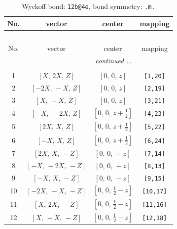 \documentclass[fleqn,8pt]{jsarticle}
\begin{document}
\renewcommand{\arraystretch}{1.2}
\begin{longtable}{cccc}
\caption{Wyckoff bond: {\tt 12b@4e}, bond symmetry: {\tt .m.}}
 \\
 \hline \hline
No. & vector & center & mapping \\ \hline \endfirsthead

\multicolumn{3}{l}{\tablename\ \thetable{}} \\
 \hline \hline
No. & vector & center & mapping \\ \hline \endhead

 \hline \hline
\multicolumn{3}{r}{\footnotesize\it continued ...} \\ \endfoot

 \hline \hline
\multicolumn{3}{r}{} \\ \endlastfoot

1 & $\left[ X,\, 2 X,\, Z \right]$ & $\left[ 0,\, 0,\, z \right]$ & {\tt [1,20]} \\ \hline
2 & $\left[ - 2 X,\, - X,\, Z \right]$ & $\left[ 0,\, 0,\, z \right]$ & {\tt [2,19]} \\ \hline
3 & $\left[ X,\, - X,\, Z \right]$ & $\left[ 0,\, 0,\, z \right]$ & {\tt [3,21]} \\ \hline
4 & $\left[ - X,\, - 2 X,\, Z \right]$ & $\left[ 0,\, 0,\, z + \frac{1}{2} \right]$ & {\tt [4,23]} \\ \hline
5 & $\left[ 2 X,\, X,\, Z \right]$ & $\left[ 0,\, 0,\, z + \frac{1}{2} \right]$ & {\tt [5,22]} \\ \hline
6 & $\left[ - X,\, X,\, Z \right]$ & $\left[ 0,\, 0,\, z + \frac{1}{2} \right]$ & {\tt [6,24]} \\ \hline
7 & $\left[ 2 X,\, X,\, - Z \right]$ & $\left[ 0,\, 0,\, - z \right]$ & {\tt [7,14]} \\ \hline
8 & $\left[ - X,\, - 2 X,\, - Z \right]$ & $\left[ 0,\, 0,\, - z \right]$ & {\tt [8,13]} \\ \hline
9 & $\left[ - X,\, X,\, - Z \right]$ & $\left[ 0,\, 0,\, - z \right]$ & {\tt [9,15]} \\ \hline
10 & $\left[ - 2 X,\, - X,\, - Z \right]$ & $\left[ 0,\, 0,\, \frac{1}{2} - z \right]$ & {\tt [10,17]} \\ \hline
11 & $\left[ X,\, 2 X,\, - Z \right]$ & $\left[ 0,\, 0,\, \frac{1}{2} - z \right]$ & {\tt [11,16]} \\ \hline
12 & $\left[ X,\, - X,\, - Z \right]$ & $\left[ 0,\, 0,\, \frac{1}{2} - z \right]$ & {\tt [12,18]} \\
\end{longtable}
\end{document}
